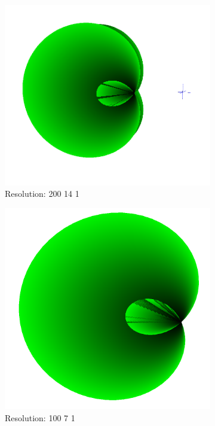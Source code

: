 \documentclass[acmlarge,nonacm=true]{acmart}
\begin{document}
\begin{figure}[H]
	\begin{subfigure}{.33\textwidth}
	  \centering
	  \includegraphics[width=.8\linewidth]{fig/3_200_14_1}
	  \caption{Resolution: 200 14 1}
	\end{subfigure}%
	\begin{subfigure}{.33\textwidth}
	  \centering
	  \includegraphics[width=.8\linewidth]{fig/3_100_7_1}
	  \caption{Resolution: 100 7 1}
	\end{subfigure}
	\begin{subfigure}{.33\textwidth}
		\centering

\end{subfigure}
\end{figure}
\end{document}
